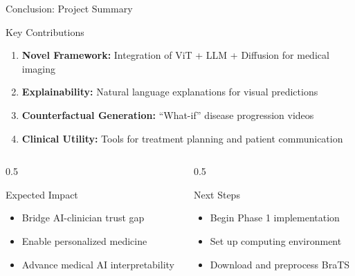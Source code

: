 \documentclass[aspectratio=169]{beamer}
\begin{document}
\begin{frame}{Conclusion: Project Summary}
    \begin{block}{Key Contributions}
        \begin{enumerate}
            \item \textbf{Novel Framework:} Integration of ViT + LLM + Diffusion for medical imaging
            \item \textbf{Explainability:} Natural language explanations for visual predictions
            \item \textbf{Counterfactual Generation:} ``What-if'' disease progression videos
            \item \textbf{Clinical Utility:} Tools for treatment planning and patient communication
        \end{enumerate}
    \end{block}
    
    \begin{columns}
        \begin{column}{0.5\textwidth}
            \begin{block}{Expected Impact}
                \begin{itemize}
                    \item Bridge AI-clinician trust gap
                    \item Enable personalized medicine
                    \item Advance medical AI interpretability
                \end{itemize}
            \end{block}
        \end{column}
        \begin{column}{0.5\textwidth}
            \begin{alertblock}{Next Steps}
                \begin{itemize}
                    \item Begin Phase 1 implementation
                    \item Set up computing environment
                    \item Download and preprocess BraTS
                \end{itemize}
            \end{alertblock}
        \end{column}
    \end{columns}
\end{frame}
\end{document}
